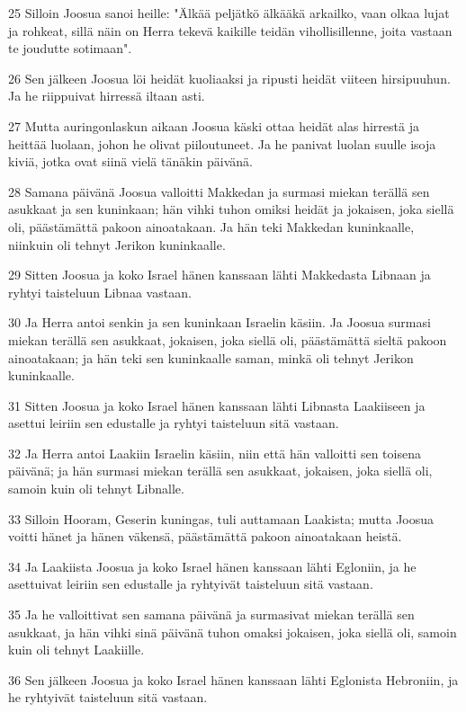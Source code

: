 \par 25 Silloin Joosua sanoi heille: "Älkää peljätkö älkääkä arkailko, vaan olkaa lujat ja rohkeat, sillä näin on Herra tekevä kaikille teidän vihollisillenne, joita vastaan te joudutte sotimaan".
\par 26 Sen jälkeen Joosua löi heidät kuoliaaksi ja ripusti heidät viiteen hirsipuuhun. Ja he riippuivat hirressä iltaan asti.
\par 27 Mutta auringonlaskun aikaan Joosua käski ottaa heidät alas hirrestä ja heittää luolaan, johon he olivat piiloutuneet. Ja he panivat luolan suulle isoja kiviä, jotka ovat siinä vielä tänäkin päivänä.
\par 28 Samana päivänä Joosua valloitti Makkedan ja surmasi miekan terällä sen asukkaat ja sen kuninkaan; hän vihki tuhon omiksi heidät ja jokaisen, joka siellä oli, päästämättä pakoon ainoatakaan. Ja hän teki Makkedan kuninkaalle, niinkuin oli tehnyt Jerikon kuninkaalle.
\par 29 Sitten Joosua ja koko Israel hänen kanssaan lähti Makkedasta Libnaan ja ryhtyi taisteluun Libnaa vastaan.
\par 30 Ja Herra antoi senkin ja sen kuninkaan Israelin käsiin. Ja Joosua surmasi miekan terällä sen asukkaat, jokaisen, joka siellä oli, päästämättä sieltä pakoon ainoatakaan; ja hän teki sen kuninkaalle saman, minkä oli tehnyt Jerikon kuninkaalle.
\par 31 Sitten Joosua ja koko Israel hänen kanssaan lähti Libnasta Laakiiseen ja asettui leiriin sen edustalle ja ryhtyi taisteluun sitä vastaan.
\par 32 Ja Herra antoi Laakiin Israelin käsiin, niin että hän valloitti sen toisena päivänä; ja hän surmasi miekan terällä sen asukkaat, jokaisen, joka siellä oli, samoin kuin oli tehnyt Libnalle.
\par 33 Silloin Hooram, Geserin kuningas, tuli auttamaan Laakista; mutta Joosua voitti hänet ja hänen väkensä, päästämättä pakoon ainoatakaan heistä.
\par 34 Ja Laakiista Joosua ja koko Israel hänen kanssaan lähti Egloniin, ja he asettuivat leiriin sen edustalle ja ryhtyivät taisteluun sitä vastaan.
\par 35 Ja he valloittivat sen samana päivänä ja surmasivat miekan terällä sen asukkaat, ja hän vihki sinä päivänä tuhon omaksi jokaisen, joka siellä oli, samoin kuin oli tehnyt Laakiille.
\par 36 Sen jälkeen Joosua ja koko Israel hänen kanssaan lähti Eglonista Hebroniin, ja he ryhtyivät taisteluun sitä vastaan.
